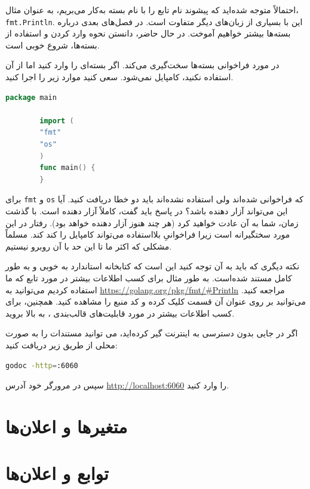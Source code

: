\documentclass{book}
\begin{document}
احتمالاً متوجه شده‌اید که پیشوند نام تابع را با نام بسته به‌کار می‌بریم، به عنوان مثال، \verb*|fmt.Println|. این با بسیاری از زبان‌های دیگر متفاوت است. در فصل‌های بعدی درباره بسته‌ها بیشتر خواهیم آموخت. در حال حاضر، دانستن نحوه وارد کردن و استفاده از بسته‌ها، شروع خوبی است.

در مورد فراخوانی بسته‌ها سخت‌گیری می‌کند. اگر بسته‌ای را وارد کنید اما از آن استفاده نکنید، کامپایل نمی‌شود. سعی کنید موارد زیر را اجرا کنید.

\begin{latin}
	\begin{lstlisting}[language=Go]
		package main
		
		import (
		"fmt"
		"os"
		)
		func main() {
		}
	\end{lstlisting}
\end{latin}
برای \verb*|fmt| و \verb*|os| که فراخوانی شده‌اند ولی استفاده نشده‌اند باید دو خطا دریافت کنید. آیا این می‌تواند آزار دهنده باشد؟ در  پاسخ باید گفت، کاملاً  آزار دهنده است. با گذشت زمان، شما به آن عادت خواهید کرد (هر چند هنوز آزار دهنده خواهد بود).
رفتار  
 در این مورد سختگیرانه است زیرا فراخوانیِ بلااستفاده می‌تواند کامپایل را کند کند. مسلماً مشکلی که اکثر ما تا این حد با آن روبرو نیستیم. 
 
 نکته دیگری که باید به آن توجه کنید این است که کتابخانه استاندارد  به خوبی و به طور کامل مستند شده‌است. به طور مثال برای کسب اطلاعات بیشتر در مورد تابع  که ما استفاده کردیم می‌توانید به \url{https://golang.org/pkg/fmt/#Println} مراجعه کنید. می‌توانید بر روی عنوان آن قسمت کلیک کرده و کد منبع را مشاهده کنید. همچنین، برای کسب اطلاعات بیشتر در مورد قابلیت‌های قالب‌بندی ، به بالا بروید.
 
اگر در جایی بدون دسترسی به اینترنت گیر کرده‌اید، می توانید مستندات را به صورت محلی از طریق زیر دریافت کنید:
\begin{latin}
	\begin{lstlisting}[language=bash]
	godoc -http=:6060
	\end{lstlisting}
\end{latin}
سپس در مرورگر خود آدرس  \url{http://localhost:6060} را وارد کنید. 
 
\newpage
\section{متغیرها و اعلان‌ها}

\newpage
\section{توابع و اعلان‌ها}
\end{document}

